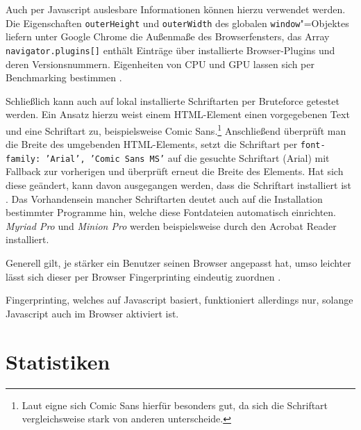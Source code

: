 \begin{appendices}
Auch per Javascript auslesbare Informationen können hierzu verwendet werden. Die Eigenschaften \texttt{outerHeight} und \texttt{outerWidth} des globalen \texttt{window}"=Objektes liefern unter Google Chrome die Außenmaße des Browserfensters, das Array \texttt{navigator.plugins[]} enthält Einträge über installierte Browser-Plugins und deren Versionsnummern. Eigenheiten von CPU und GPU lassen sich per Benchmarking bestimmen \cite{Janc.o.J.}.

Schließlich kann auch auf lokal installierte Schriftarten per Bruteforce getestet werden. Ein Ansatz hierzu weist einem HTML-Element einen vorgegebenen Text und eine Schriftart zu, beispielsweise Comic Sans.\footnote{Laut \cite{Sharp.2008} eigne sich Comic Sans hierfür besonders gut, da sich die Schriftart vergleichsweise stark von anderen unterscheide.} Anschließend überprüft man die Breite des umgebenden HTML-Elements, setzt die Schriftart per \texttt{font-family: 'Arial', 'Comic Sans MS'} auf die gesuchte Schriftart (Arial) mit Fallback zur vorherigen und überprüft erneut die Breite des Elements. Hat sich diese geändert, kann davon ausgegangen werden, dass die Schriftart installiert ist \cite{Sharp.2008}. Das Vorhandensein mancher Schriftarten deutet auch auf die Installation bestimmter Programme hin, welche diese Fontdateien automatisch einrichten. \emph{Myriad Pro} und \emph{Minion Pro} werden beispielsweise durch den Acrobat Reader installiert.

Generell gilt, je stärker ein Benutzer seinen Browser angepasst hat, umso leichter lässt sich dieser per Browser Fingerprinting eindeutig zuordnen \cite[S. 185]{Boos.2015}.

Fingerprinting, welches auf Javascript basiert, funktioniert allerdings nur, solange Javascript auch im Browser aktiviert ist.

\chapter{Statistiken}


\end{appendices}
